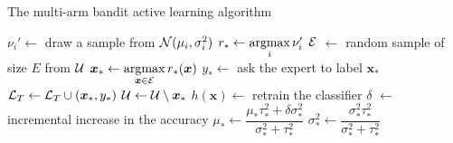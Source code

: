 \begin{algorithm}[p]
	\caption{The multi-arm bandit active learning algorithm} 
	\label{alg:bandit}
	\begin{algorithmic}[1]
        			\State $\nu_i' \leftarrow$ draw a sample from $\mathcal{N}(\mu_i, \sigma^2_i)$
        		\Endforeach
        		\State $r_* \leftarrow \argmax_{i} \nu_i'$
        		\State $\mathcal{E}$ $\leftarrow$ random sample of size $E$ from $\mathcal{U}$
        		\State $\bm{x}_* \leftarrow \argmax_{\bm{x} \in \Ecal} r_*(\bm{x})$
        		\State $y_* \leftarrow$ ask the expert to label $\bm{x}_*$
        		\State $\mathcal{L}_T \leftarrow \mathcal{L}_T  \cup (\bm{x}_*, y_*)$
        		\State $\mathcal{U} \leftarrow \mathcal{U} \setminus \bm{x}_*$
        		\State $h(\bm{x}) \leftarrow$ retrain the classifier
        		\State $\delta$ $\leftarrow$ incremental increase in the accuracy
        		\State $\mu_* \leftarrow \dfrac{\mu_* \tau^2_* + \delta \sigma^2_*}{\sigma^2_* + \tau^2_*}$
                \State $\sigma_*^2 \leftarrow \dfrac{\sigma^2_* \tau^2_*}{\sigma^2_* + \tau^2_*}$
    		\EndWhile
		\EndProcedure
	\end{algorithmic}
\end{algorithm}

